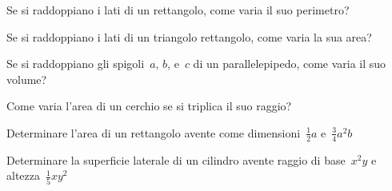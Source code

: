 \begin{multicols}{2}
\begin{esercizio}
\label{ese:10.36}
 Se si raddoppiano i lati di un rettangolo, come varia il suo
perimetro?
\end{esercizio}

\begin{esercizio}
\label{ese:10.37}
 Se si raddoppiano i lati di un triangolo rettangolo, come varia la sua
area?
\end{esercizio}

\begin{esercizio}
\label{ese:10.38}
 Se si raddoppiano gli spigoli~$a$, $b$, e~$c$ di un parallelepipedo, come
varia il suo volume?
\end{esercizio}

\begin{esercizio}
\label{ese:10.39}
 Come varia l'area di un cerchio se si triplica il suo
raggio?
\end{esercizio}

\begin{esercizio}
\label{ese:10.40}
 Determinare l'area di un rettangolo avente come
dimensioni~$\frac{1}{2}a$ e~$\frac{3}{4}a^{2}b$
\end{esercizio}

\begin{esercizio}
\label{ese:10.41}
 Determinare la superficie laterale di un cilindro avente raggio di
base~$x^{2}y$ e altezza~$\frac{1}{5}{xy}^{2}$
\end{esercizio}
\end{multicols}


